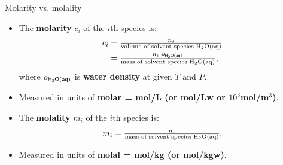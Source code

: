 \begin{frame}{Molarity vs. molality}
%
\lcol
\vskip 20pt
\begin{itemize}
\item The \textbf{molarity} $c_{i}$ of the $i$th species is:
\begin{alignat*}{2}
c_{i} & = \tfrac{n_{i}}{\text{volume of solvent species H\ensuremath{_{2}}O(aq)}} \\
	& = \tfrac{n_{i} \cdot \rho_{\sf H{_{2}}O(aq)}}{\text{mass of solvent species H\ensuremath{_{2}}O(aq)}},
\end{alignat*}
where $\rho_{\sf H{_{2}}O(aq)}$ is \textbf{water density} at given $T$ and $P$.
\item Measured in units of {\bf \alert{molar} = mol/L (or mol/Lw or  $10^3$mol/m$^3$)}. 
\end{itemize}
\rcol
\begin{itemize}
\item The \textbf{molality} $m_{i}$ of the $i$th species is:
\[
m_{i}=\tfrac{n_{i}}{\text{mass of solvent species H\ensuremath{_{2}}O(aq)}}.
\]
\item Measured in units of {\bf \alert{molal} = mol/kg (or mol/kgw)}. 
\end{itemize}
\ecol
\end{frame}
%
%
